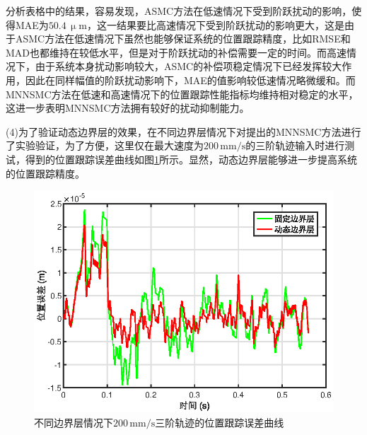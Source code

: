 分析表格中的结果，容易发现，ASMC方法在低速情况下受到阶跃扰动的影响，使得MAE为$50.4\,\upmu$$\text{m}$，这一结果要比高速情况下受到阶跃扰动的影响更大，这是由于ASMC方法在低速情况下虽然也能够保证系统的位置跟踪精度，比如RMSE和MAD也都维持在较低水平，但是对于阶跃扰动的补偿需要一定的时间。而高速情况下，由于系统本身扰动影响较大，ASMC的补偿项稳定情况下已经发挥较大作用，因此在同样幅值的阶跃扰动影响下，MAE的值影响较低速情况略微缓和。而MNNSMC方法在低速和高速情况下的位置跟踪性能指标均维持相对稳定的水平，这进一步表明MNNSMC方法拥有较好的扰动抑制能力。

(4)为了验证动态边界层的效果，在不同边界层情况下对提出的MNNSMC方法进行了实验验证，为了方便，这里仅在最大速度为$200\,\text{mm/s}$的三阶轨迹输入时进行测试，得到的位置跟踪误差曲线如图\ref{不同边界层}所示。显然，动态边界层能够进一步提高系统的位置跟踪精度。
\begin{figure}[H]
	\centering
	\includegraphics[width=12cm]{figures/不同边界层.eps}
	\caption{不同边界层情况下$200\,\text{mm/s}$三阶轨迹的位置跟踪误差曲线}
	\label{不同边界层}
\end{figure}
